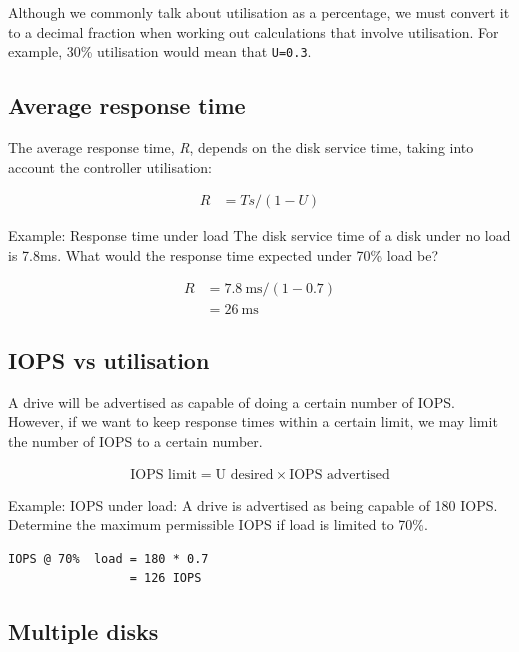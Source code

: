 Although we commonly talk about utilisation as a percentage, we must
convert it to a decimal fraction when working out calculations that
involve utilisation. For example, 30\% utilisation would mean that
\texttt{U=0.3}.

\subsection{Average response time}
\label{sec:average-response-time}

The average response time, {\emph{R}}, depends on the disk service time,
taking into account the controller utilisation:

\begin{align}
R & = Ts / ( 1 - U ) \label{eq:response-time}
\end{align}

Example: Response time under load The disk service time of a disk under
no load is 7.8ms. What would the response time expected under 70\% load
be?

\begin{align}
R & = \SI{7.8}{\milli\second} / ( 1 - 0.7 ) \\
  & = \SI{26}{\milli\second}
\end{align}

\subsection{IOPS vs utilisation}
\label{sec:iops-vs-utilisation}

A drive will be advertised as capable of doing a certain number of IOPS.
However, if we want to keep response times within a certain limit, we
may limit the number of IOPS to a certain number.

\begin{align}
  \mbox{IOPS limit} = \mbox{U desired} \times \mbox{IOPS advertised} \label{eq:iops-under-load}
\end{align}

Example: IOPS under load: A drive is advertised as being capable of 180
IOPS. Determine the maximum permissible IOPS if load is limited to 70\%.

\begin{verbatim}
IOPS @ 70%  load = 180 * 0.7
                 = 126 IOPS
\end{verbatim}

\subsection{Multiple disks}\label{multiple-disks}

